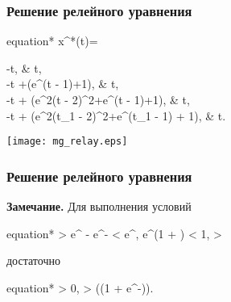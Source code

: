 \begin{frame}
	\frametitle{Решение релейного уравнения}
	\footnotesize
	\begin{empheq}[box=\myeq]{equation*}
		x^*(t)= 
		\begin{cases}
			-\beta t, & t\in[-\sigma_0, 1],\\
			-\beta t +\ln(\alpha e^{\beta}(t - 1)+1), & t\in[1, 2],\\
			-\beta t + \ln(e^{2\beta}(t - 2)^2+\alpha e^{\beta}(t - 1)+1), & t\in[2, t_1],\\
			-\beta t + \ln(e^{2\beta}(t_1 - 2)^2+\alpha e^{\beta}(t_1 - 1) + 1), & t\in[t_1, t_2].
		\end{cases}
	\end{empheq}
	\normalsize
	\begin{center}
		\texttt{[image: mg\_relay.eps]}
	\end{center}
	
\end{frame}

\begin{frame}
	\frametitle{Решение релейного уравнения}
	
	\textbf{Замечание.} Для выполнения условий
	\footnotesize
	\begin{empheq}[box=\myeq]{equation*}
		\alpha > e^{\beta} - e^{-\beta}  \alpha < \beta e^{\beta}, \quad 
		\frac{\alpha}{\beta}e^{\beta}\left(1 + \ln\frac{\beta}{\alpha}\right) < 1, \quad 
		\alpha > 
	\end{empheq}
	\normalsize
	достаточно
	\begin{empheq}[box=\myeq]{equation*}
		\beta > 0, \quad \alpha > \exp(\beta(1 + e^{-\beta})).
	\end{empheq}
	
\end{frame}

